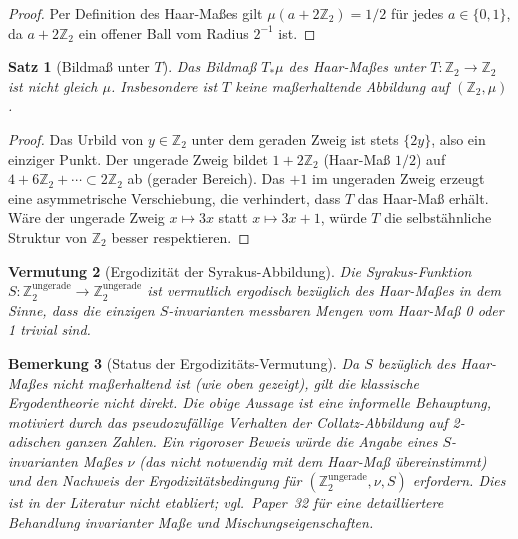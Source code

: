 \documentclass[12pt,a4paper]{article}
\newtheorem{theorem}{Satz}[section]
\newtheorem{remark}[theorem]{Bemerkung}
\newtheorem{conjecture}[theorem]{Vermutung}
\begin{document}
\begin{proof}
Per Definition des Haar-Maßes gilt $\mu(a + 2\mathbb{Z}_2) = 1/2$ für jedes $a \in \{0,1\}$,
da $a + 2\mathbb{Z}_2$ ein offener Ball vom Radius $2^{-1}$ ist.
\end{proof}

\begin{theorem}[Bildmaß unter $T$]\label{thm:bildmass}
Das Bildmaß $T_* \mu$ des Haar-Maßes unter $T\colon \mathbb{Z}_2 \to \mathbb{Z}_2$
ist nicht gleich $\mu$. Insbesondere ist $T$ keine maßerhaltende Abbildung auf
$(\mathbb{Z}_2, \mu)$.
\end{theorem}

\begin{proof}
Das Urbild von $y \in \mathbb{Z}_2$ unter dem geraden Zweig ist stets $\{2y\}$, also
ein einziger Punkt. Der ungerade Zweig bildet $1 + 2\mathbb{Z}_2$ (Haar-Maß $1/2$)
auf $4 + 6\mathbb{Z}_2 + \cdots \subset 2\mathbb{Z}_2$ ab (gerader Bereich). Das $+1$
im ungeraden Zweig erzeugt eine asymmetrische Verschiebung, die verhindert, dass $T$
das Haar-Maß erhält. Wäre der ungerade Zweig $x \mapsto 3x$ statt $x \mapsto 3x+1$,
würde $T$ die selbstähnliche Struktur von $\mathbb{Z}_2$ besser respektieren.
\end{proof}

\begin{conjecture}[Ergodizität der Syrakus-Abbildung]\label{conj:ergodisch_S}
Die Syrakus-Funktion $S\colon \mathbb{Z}_2^{\text{ungerade}} \to \mathbb{Z}_2^{\text{ungerade}}$
ist vermutlich \emph{ergodisch bezüglich des Haar-Maßes} in dem Sinne, dass die einzigen
$S$-invarianten messbaren Mengen vom Haar-Maß 0 oder 1 trivial sind.
\end{conjecture}

\begin{remark}[Status der Ergodizitäts-Vermutung]
Da $S$ bezüglich des Haar-Maßes \emph{nicht} maßerhaltend ist (wie oben gezeigt),
gilt die klassische Ergodentheorie nicht direkt. Die obige Aussage ist eine informelle
Behauptung, motiviert durch das pseudozufällige Verhalten der Collatz-Abbildung auf
2-adischen ganzen Zahlen. Ein rigoroser Beweis würde die Angabe eines $S$-invarianten
Maßes $\nu$ (das nicht notwendig mit dem Haar-Maß übereinstimmt) und den Nachweis
der Ergodizitätsbedingung für $(\mathbb{Z}_2^{\text{ungerade}}, \nu, S)$ erfordern.
Dies ist in der Literatur nicht etabliert; vgl.\ Paper~32 für eine detailliertere
Behandlung invarianter Maße und Mischungseigenschaften.
\end{remark}
\end{document}
